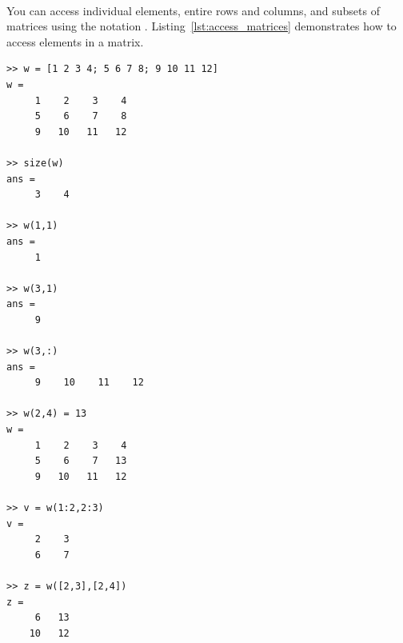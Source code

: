 \addtolength{\parindent}{-4mm}
\\
\addtolength{\parindent}{4mm}

You can access individual elements, entire rows and columns, and subsets of matrices using the notation . Listing~\ref{lst:access_matrices} demonstrates how to access elements in a matrix. 
\begin{lstlisting}[caption={Accessing elements of matrices},label=lst:access_matrices]
>> w = [1 2 3 4; 5 6 7 8; 9 10 11 12]
w =
	 1    2    3    4
	 5    6    7    8
	 9   10   11   12
	 
>> size(w)
ans =
	 3    4

>> w(1,1)
ans = 
	 1
	 
>> w(3,1)
ans =
	 9
	 
>> w(3,:)
ans = 
	 9    10    11    12
	 
>> w(2,4) = 13
w =
	 1    2    3    4
	 5    6    7   13
	 9   10   11   12
	 
>> v = w(1:2,2:3)
v =
	 2    3
	 6    7
	 
>> z = w([2,3],[2,4])
z =
	 6   13
	10   12
\end{lstlisting}

